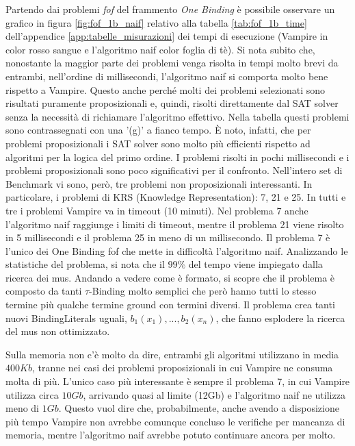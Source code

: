 \documentclass[./main.tex]{subfiles}
\begin{document}
Partendo dai problemi \textit{fof} del frammento \textit{One Binding} è possibile osservare un grafico in figura \ref{fig:fof_1b_naif}
relativo alla tabella \ref{tab:fof_1b_time} dell'appendice \ref{app:tabelle_misurazioni} dei tempi di esecuzione (Vampire in color rosso sangue e l'algoritmo naif color foglia di tè). 
Si nota subito che, nonostante la maggior parte dei problemi venga risolta in tempi molto brevi da entrambi, 
nell'ordine di millisecondi, l'algoritmo naif si comporta molto bene rispetto a Vampire.
Questo anche perché molti dei problemi selezionati sono risultati puramente proposizionali e, quindi, risolti direttamente dal SAT solver
senza la necessità di richiamare l'algoritmo effettivo.
Nella tabella questi problemi sono contrassegnati con una '(g)' a fianco tempo.
È noto, infatti, che per problemi proposizionali i SAT solver sono molto più efficienti rispetto ad algoritmi per la logica del primo ordine.
I problemi risolti in pochi millisecondi e i problemi proposizionali sono poco significativi per il confronto.
Nell'intero set di Benchmark vi sono, però, tre problemi non proposizionali interessanti. 
In particolare, i problemi di KRS (Knowledge Representation): 7, 21 e 25.
In tutti e tre i problemi Vampire va in timeout (10 minuti).
Nel problema 7 anche l'algoritmo naif raggiunge i limiti di timeout,
mentre il problema 21 viene risolto in 5 millisecondi e il problema 25 in meno di un millisecondo.
Il problema 7 è l'unico dei One Binding fof che mette in difficoltà l'algoritmo naif.
Analizzando le statistiche del problema, si nota che il $99\%$ del tempo viene impiegato dalla ricerca 
dei mus. 
Andando a vedere come è formato, si scopre che il problema è composto da tanti $\tau$-Binding 
molto semplici che però hanno tutti lo stesso termine più qualche termine ground con termini diversi.
Il problema crea tanti nuovi BindingLiterals uguali, $b_1(x_1), ..., b_2(x_n)$, che fanno esplodere la ricerca del mus non ottimizzato.

Sulla memoria non c'è molto da dire, entrambi gli algoritmi utilizzano in media $400Kb$, tranne nei casi
dei problemi proposizionali in cui Vampire ne consuma molta di più. 
L'unico caso più interessante è sempre il problema 7, in cui Vampire utilizza circa $10Gb$, 
arrivando quasi al limite (12Gb) e l'algoritmo naif ne utilizza meno di $1Gb$.
Questo vuol dire che, probabilmente, anche avendo a disposizione più tempo Vampire non avrebbe comunque concluso le verifiche
per mancanza di memoria, mentre l'algoritmo naif avrebbe potuto continuare ancora per molto.
\end{document}

